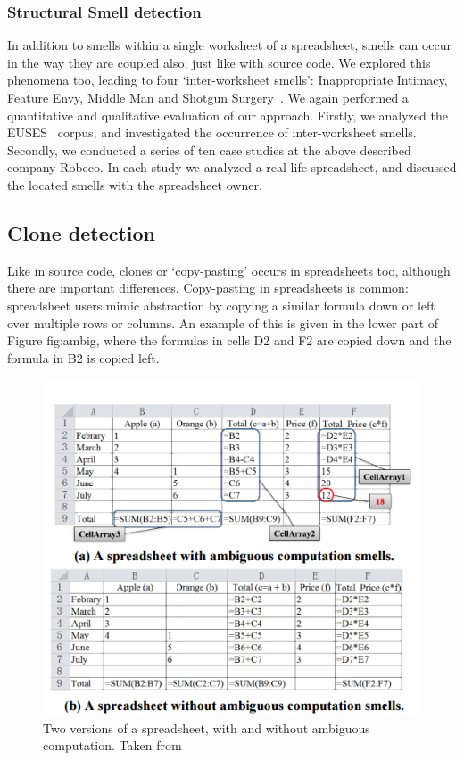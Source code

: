 \documentclass[conference]{IEEEtran}
\begin{document}
\subsubsection{Structural Smell detection}
In addition to smells within a single worksheet of a spreadsheet, smells can occur in the way they are coupled also; just like with source code. We explored this phenomena too, leading to four `inter-worksheet smells': Inappropriate Intimacy, Feature Envy, Middle Man and Shotgun Surgery~\cite{hermans_detecting_2012-1}. We again performed a quantitative and qualitative evaluation of our approach. Firstly, we analyzed the EUSES~\cite{fisher_euses_2005} corpus, and investigated the occurrence of inter-worksheet smells. Secondly, we conducted a series of ten case studies at the above described company Robeco. In each study we analyzed a real-life spreadsheet, and discussed the located smells with the spreadsheet owner.  

\subsection{Clone detection}
Like in source code, clones or `copy-pasting' occurs in spreadsheets too, although there are important differences. 
Copy-pasting in spreadsheets is common: spreadsheet users mimic abstraction by copying a similar formula down or left over multiple rows or columns. An example of this is given in the lower part of Figure {fig:ambig}, where the formulas in cells D2 and F2 are copied down and the formula in B2 is copied left.

\begin{figure}
  \begin{center}
  \includegraphics[width=\columnwidth]{fig/ambig.png}
  \caption{Two versions of a spreadsheet, with and without ambiguous computation. Taken from \cite{dou_is_2014}}
  \label{fig:ambig}
  \end{center}
\end{figure} 
\end{document}

